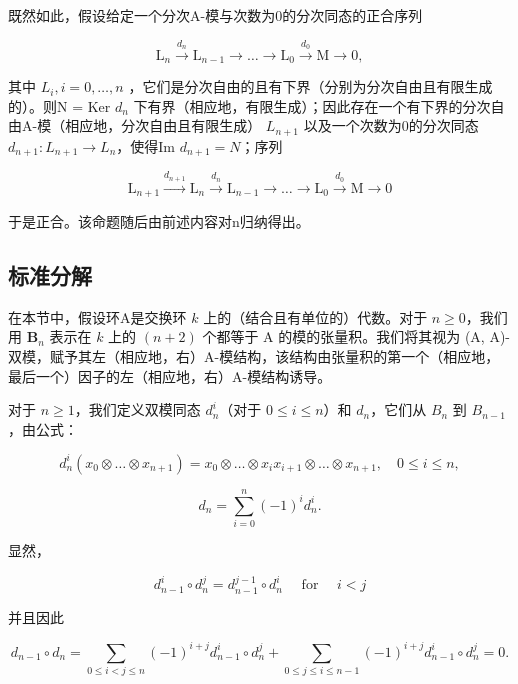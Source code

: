 既然如此，假设给定一个分次A-模与次数为0的分次同态的正合序列

\[
\mathrm{L} _ {n} \xrightarrow {d _ {n}} \mathrm{L} _ {n - 1} \longrightarrow \dots \longrightarrow \mathrm{L} _ {0} \xrightarrow {d _ {0}} \mathrm{M} \longrightarrow 0,
\]

其中 \(L_{i}, i = 0, \ldots, n\) ，它们是分次自由的且有下界（分别为分次自由且有限生成的）。则N = Ker \(d_{n}\) 下有界（相应地，有限生成）；因此存在一个有下界的分次自由A-模（相应地，分次自由且有限生成） \(L_{n+1}\) 以及一个次数为0的分次同态 \(d_{n+1}: L_{n+1} \to L_{n}\)，使得Im \(d_{n+1} = N\)；序列

\[
\mathrm{L} _ {n + 1} \xrightarrow {d _ {n + 1}} \mathrm{L} _ {n} \xrightarrow {d _ {n}} \mathrm{L} _ {n - 1} \longrightarrow \dots \longrightarrow \mathrm{L} _ {0} \xrightarrow {d _ {0}} \mathrm{M} \longrightarrow 0
\]

于是正合。该命题随后由前述内容对n归纳得出。

\subsection{标准分解}

在本节中，假设环A是交换环 \(k\) 上的（结合且有单位的）代数。对于 \(n \geqslant 0\)，我们用 \(\mathbf{B}_n\) 表示在 \(k\) 上的 \((n + 2)\) 个都等于 A 的模的张量积。我们将其视为 (A, A)-双模，赋予其左（相应地，右）A-模结构，该结构由张量积的第一个（相应地，最后一个）因子的左（相应地，右）A-模结构诱导。

对于 \(n \geqslant 1\)，我们定义双模同态 \(d_n^i\)（对于 \(0 \leqslant i \leqslant n\)）和 \(d_n\)，它们从 \(B_n\) 到 \(B_{n-1}\)，由公式：

\[
d _ {n} ^ {i} (x _ {0} \otimes \ldots \otimes x _ {n + 1}) = x _ {0} \otimes \ldots \otimes x _ {i} x _ {i + 1} \otimes \ldots \otimes x _ {n + 1}, \quad 0 \leqslant i \leqslant n,
\]

\[
d _ {n} = \sum_ {i = 0} ^ {n} (- 1) ^ {i} d _ {n} ^ {i}.
\]

显然，

\[
d _ {n - 1} ^ {i} \circ d _ {n} ^ {j} = d _ {n - 1} ^ {j - 1} \circ d _ {n} ^ {i} \quad \text { for } \quad i <   j
\]

并且因此

\[
d _ {n - 1} \circ d _ {n} = \sum_ {0 \leqslant i <   j \leqslant n} (- 1) ^ {i + j} d _ {n - 1} ^ {i} \circ d _ {n} ^ {j} + \sum_ {0 \leqslant j \leqslant i \leqslant n - 1} (- 1) ^ {i + j} d _ {n - 1} ^ {i} \circ d _ {n} ^ {j} = 0.
\]

